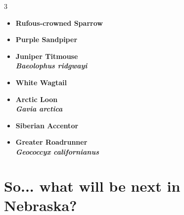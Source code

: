 \documentclass[10pt,letterpaper]{article}
\begin{document}
\begin{multicols}{3}
\begin{itemize}
		\item \textbf{Rufous-crowned Sparrow}
		\item \textbf{Purple Sandpiper}
		\item \textbf{Juniper Titmouse \\ \textit{Baeolophus ridgwayi}}
		\item \textbf{White Wagtail}
		\item \textbf{Arctic Loon \\ \textit{Gavia arctica}}
		\item \textbf{Siberian Accentor}
		\item \textbf{Greater Roadrunner \\ \textit{Geococcyx californianus}}
	\end{itemize}
	
	
\end{multicols}

\section*{So... what will be next in Nebraska?}
\end{document}
